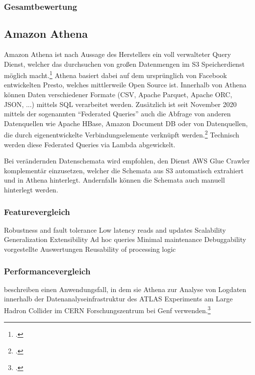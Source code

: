\subsubsection{Gesamtbewertung}

\subsection{Amazon Athena}\label{chap:athena}


Amazon Athena ist nach Aussage des Herstellers ein voll verwalteter Query Dienst, welcher das durchsuchen von großen Datenmengen im \ac{S3} Speicherdienst möglich macht.\footcite[Vgl.][]{Barr.2016} Athena basiert dabei auf dem ursprünglich von Facebook entwickelten Presto, welches mittlerweile Open Source ist. Innerhalb von Athena können Daten verschiedener Formate (\ac{CSV}, Apache Parquet, Apache ORC, \ac{JSON}, ...) mittels \ac{SQL} verarbeitet werden. Zusätzlich ist seit November 2020 mittels der sogenannten \enquote{Federated Queries} auch die Abfrage von anderen Datenquellen wie Apache HBase, Amazon Document DB oder von Datenquellen, die durch eigenentwickelte Verbindungselemente verknüpft werden.\footcite[Vgl.][]{AmazonWebServicesInc..o.J.s} Technisch werden diese Federated Queries via Lambda abgewickelt.



Bei verändernden Datenschemata wird empfohlen, den Dienst \ac{AWS} Glue Crawler komplementär einzusetzen, welcher die Schemata aus \ac{S3} automatisch extrahiert und in Athena hinterlegt. Andernfalls können die Schemata auch manuell hinterlegt werden.

\subsubsection{Featurevergleich} 
Robustness and fault tolerance
Low latency reads and updates
Scalability
Generalization
Extensibility
Ad hoc queries
Minimal maintenance
Debuggability
vorgestellte Auswertungen 
Reusability of processing logic

\subsubsection{Performancevergleich}

\citeauthor{Hartland.2018} beschreiben einen Anwendungsfall, in dem sie Athena zur Analyse von Logdaten innerhalb der Datenanalyseinfrastruktur des ATLAS Experiments am Large Hadron Collider im CERN Forschungszentrum bei Genf verwenden.\footcite[Vgl.][]{Hartland.2018}

